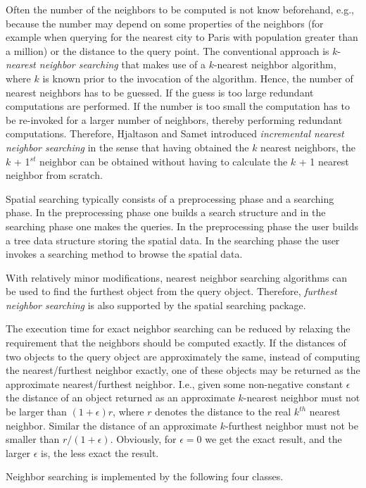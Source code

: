 Often the number of the neighbors to be computed is not know
beforehand, e.g., because the number may depend on some properties of
the neighbors (for example when querying for the nearest city to Paris with
population greater than a million) or the distance to the query point.
The conventional approach is $k$-{\em nearest neighbor searching} that
makes use of a $k$-nearest neighbor algorithm, where $k$ is known
prior to the invocation of the algorithm.  Hence, the number of
nearest neighbors has to be guessed. If the guess is too large
redundant computations are performed.  If the number is too small the
computation has to be re-invoked for a larger number of neighbors,
thereby performing redundant computations.  Therefore, Hjaltason and
Samet \cite{hs-rsd-95} introduced {\em incremental nearest neighbor
searching} in the sense that having obtained the $k$ nearest
neighbors, the $k$ + 1$^{st}$ neighbor can be obtained without having
to calculate the $k$ + 1 nearest neighbor from scratch.
 

Spatial searching typically consists of a preprocessing phase and a
searching phase.  In the preprocessing phase one builds a search
structure and in the searching phase one makes the queries.  In the
preprocessing phase the user builds a tree data structure
storing the spatial data.  In the searching phase the user invokes a
searching method to browse the spatial data.

With relatively minor modifications, nearest neighbor searching
algorithms can be used to find the furthest object from the query
object.  Therefore, {\em furthest neighbor searching} is also
supported by the spatial searching package.

The execution time for exact neighbor searching can be reduced by
relaxing the requirement that the neighbors should be computed
exactly.  If the distances of two objects to the query object are
approximately the same, instead of computing the nearest/furthest
neighbor exactly, one of these objects may be returned as the
approximate nearest/furthest neighbor. I.e., given some non-negative
constant $\epsilon$ the distance of an object returned as an
approximate $k$-nearest neighbor must not be larger than
$(1+\epsilon)r$, where $r$ denotes the distance to the real $k^{th}$
nearest neighbor.  Similar the distance of an approximate $k$-furthest
neighbor must not be smaller than $r/(1+\epsilon)$.  Obviously, for
$\epsilon=0$ we get the exact result, and the larger $\epsilon$ is,
the less exact the result.

Neighbor searching is implemented by the following four classes.

